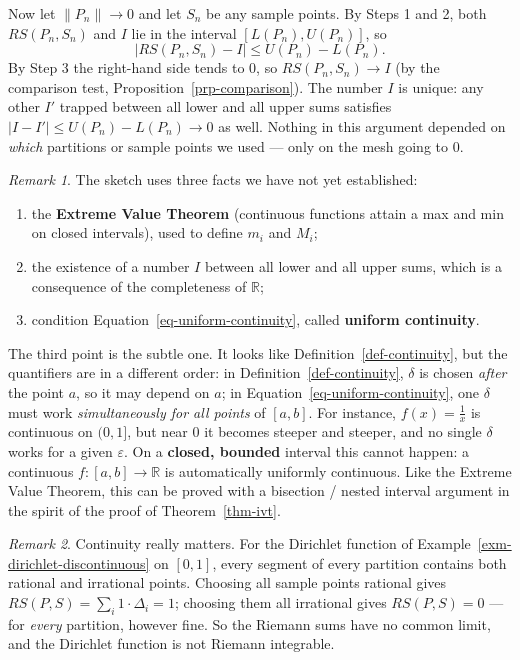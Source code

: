 \documentclass[
  letterpaper,
  DIV=11,
  numbers=noendperiod]{scrreprt}
\providecommand{\tightlist}{%
  \setlength{\itemsep}{0pt}\setlength{\parskip}{0pt}}
\theoremstyle{plain}
\theoremstyle{plain}
\theoremstyle{definition}
\theoremstyle{definition}
\theoremstyle{definition}
\theoremstyle{plain}
\theoremstyle{plain}
\theoremstyle{remark}
\newtheorem{refremark}{Remark}[chapter]
\begin{document}
Now let \(\|P_n\|\to0\) and let \(S_n\) be any sample points. By Steps 1
and 2, both \(RS(P_n,S_n)\) and \(I\) lie in the interval
\([L(P_n),U(P_n)]\), so \[
\lvert RS(P_n,S_n) - I \rvert \le U(P_n) - L(P_n).
\] By Step 3 the right-hand side tends to \(0\), so \(RS(P_n,S_n)\to I\)
(by the comparison test, Proposition~\ref{prp-comparison}). The number
\(I\) is unique: any other \(I'\) trapped between all lower and all
upper sums satisfies \(\lvert I-I' \rvert\le U(P_n)-L(P_n)\to0\) as
well. Nothing in this argument depended on \emph{which} partitions or
sample points we used --- only on the mesh going to \(0\).

\begin{refremark}
The sketch uses three facts we have not yet established:

\begin{enumerate}
\def\labelenumi{\arabic{enumi}.}
\tightlist
\item
  the \textbf{Extreme Value Theorem} (continuous functions attain a max
  and min on closed intervals), used to define \(m_i\) and \(M_i\);
\item
  the existence of a number \(I\) between all lower and all upper sums,
  which is a consequence of the completeness of \(\mathbb{R}\);
\item
  condition Equation~\ref{eq-uniform-continuity}, called \textbf{uniform
  continuity}.
\end{enumerate}

The third point is the subtle one. It looks like
Definition~\ref{def-continuity}, but the quantifiers are in a different
order: in Definition~\ref{def-continuity}, \(\delta\) is chosen
\emph{after} the point \(a\), so it may depend on \(a\); in
Equation~\ref{eq-uniform-continuity}, one \(\delta\) must work
\emph{simultaneously for all points} of \([a,b]\). For instance,
\(f(x)=\tfrac1x\) is continuous on \((0,1]\), but near \(0\) it becomes
steeper and steeper, and no single \(\delta\) works for a given
\(\varepsilon\). On a \textbf{closed, bounded} interval this cannot
happen: a continuous \(f\colon[a,b]\to\mathbb{R}\) is automatically
uniformly continuous. Like the Extreme Value Theorem, this can be proved
with a bisection / nested interval argument in the spirit of the proof
of Theorem~\ref{thm-ivt}.

\label{rem-darboux-informal}

\end{refremark}

\begin{refremark}
Continuity really matters. For the Dirichlet function of
Example~\ref{exm-dirichlet-discontinuous} on \([0,1]\), every segment of
every partition contains both rational and irrational points. Choosing
all sample points rational gives
\(RS(P,S) = \sum_i 1\cdot\Delta_i = 1\); choosing them all irrational
gives \(RS(P,S)=0\) --- for \emph{every} partition, however fine. So the
Riemann sums have no common limit, and the Dirichlet function is not
Riemann integrable.

\label{rem-dirichlet-not-integrable}

\end{refremark}
\end{document}
